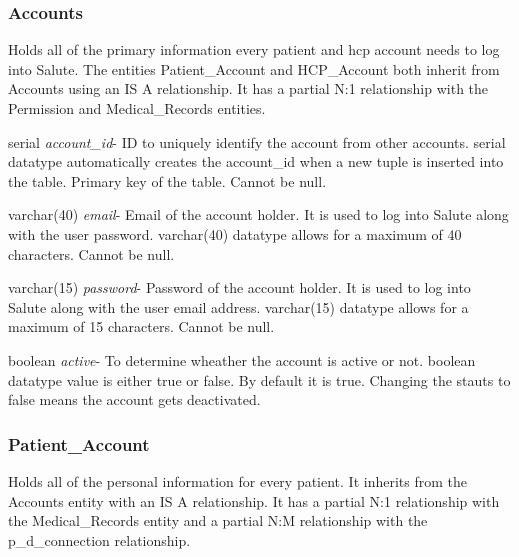 \documentclass[12pt]{report}
\begin{document}
\subsubsection{Accounts}
Holds all of the primary information every patient and hcp account needs to log into Salute.  The entities Patient\_Account and HCP\_Account both inherit from Accounts using an IS A relationship.  It has a partial N:1 relationship with the Permission and Medical\_Records entities.

\begin{description}
\item serial \textit{account\_id}- ID to uniquely identify the account from other accounts. serial datatype automatically creates the account\_id when a new tuple is inserted into the table.  Primary key of the table.  Cannot be null.
\item varchar(40) \textit{email}- Email of the account holder. It is used to log into Salute along with the user password.  varchar(40) datatype allows for a maximum of 40 characters.  Cannot be null.
\item varchar(15) \textit{password}-  Password of the account holder.  It is used to log into Salute along with the user email address.  varchar(15) datatype allows for a maximum of 15 characters.  Cannot be null.
\item boolean \textit{active}- To determine wheather the account is active or not.  boolean datatype value is either true or false.  By default it is true.  Changing the stauts to false means the account gets deactivated.
\end{description}

\subsubsection{Patient\_Account}
Holds all of the personal information for every patient.  It inherits from the Accounts entity with an IS A relationship.  It has a partial N:1 relationship with the Medical\_Records entity and a partial N:M relationship with the p\_d\_connection relationship.
\end{document}
